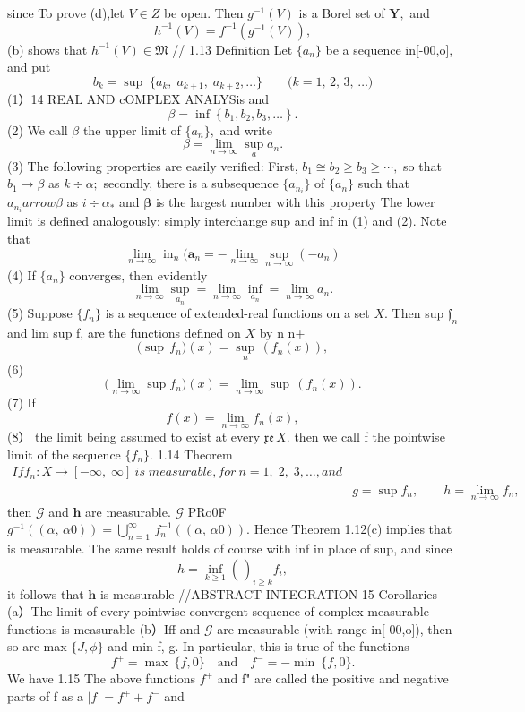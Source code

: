 since To prove (d),let $\scriptstyle V\in Z$ be open. Then $g^{-1}(V)$ is a Borel set of ${\boldsymbol{Y}},$ and $$ h^{-1}(V)=f^{-1}(g^{-1}(V)), $$ (b) shows that $h^{-1}(V)\in{\mathfrak{M}}$ // 1.13 Definition Let $\{a_{n}\}$ be a sequence in[-00,o], and put $$ b_{k}=\operatorname*{sup}\;\{a_{k},\;a_{k+1},\;a_{k+2},\ldots\}\qquad\bigl(k=1,\,2,\,3,\,\ldots\bigr) $$ (1）14 REAL AND cOMPLEX ANALYSis and $$ \beta=\operatorname*{inf}\left\{b_{1},b_{2},b_{3},\ldots\right\}. $$ (2) We call $\beta$ the upper limit of $\{a_{n}\},$ and write $$ \beta=\operatorname*{lim}_{n\to\infty}\operatorname*{sup}_{a}a_{n}. $$ (3) The following properties are easily verified: First, $b_{1}\cong b_{2}\geq b_{3}\geq\cdots,$ so that $b_{1}\to\beta$ as $k\div\alpha;$ secondly, there is a subsequence $\{a_{n_{i}}\}$ of $\{a_{n}\}$ such that $a_{n_{i}} arrow\beta$ as $i\div\alpha_{*}$ and $\boldsymbol{\beta}$ is the largest number with this property The lower limit is defined analogously: simply interchange sup and inf in (1) and (2). Note that $$ \operatorname*{lim}_{n\to\infty}\operatorname{in}_{n}(\mathbf{a}_{n}=\mathbf{-}\operatorname*{lim}_{n\to\infty}\operatorname{sup}_{n\to\infty}\left(-a_{n}\right) $$ (4) If $\{a_{n}\}$ converges, then evidently $$ \operatorname*{lim}_{n\to\infty}\operatorname*{sup}_{a_{n}}=\operatorname*{lim}_{n\to\infty}\operatorname*{inf}_{a_{n}}=\operatorname*{lim}_{n\to\infty}a_{n}. $$ (5) Suppose $\{f_{n}\}$ is a sequence of extended-real functions on a set $X.$ Then sup ${\mathfrak{f}}_{n}$ and lim sup f, are the functions defined on $X$ by n n+ $$ {\biggl(}{\operatorname*{sup}}\,f_{n}{\biggr)}(x)=\operatorname*{sup}_{n}\,(f_{n}(x)), $$ (6) $$ {\biggl(}\operatorname*{lim}_{n\to\infty}\operatorname{sup}f_{n}{\biggr)}(x)=\operatorname*{lim}_{n\to\infty}\operatorname{sup}\,(f_{n}(x)). $$ (7) If $$ f(x)=\operatorname*{lim}_{n\to\infty}f_{n}(x), $$ (8） the limit being assumed to exist at every ${\mathfrak{x e}}\,X.$ then we call f the pointwise limit of the sequence $\{f_{n}\}.$ 1.14 Theorem $$ \begin{array}{c}{{I f f_{n}\colon X\to[-\infty,\;\infty]\ i s\;m e a s u r a b l e,f o r\ n=1,\;2,\;3,\ldots,a n d}}\\ {{}}&{{g=\operatorname*{sup}f_{n},\qquad h=\operatorname*{lim}_{n\to\infty}f_{n},}}\end{array} $$ then $\scriptstyle{\mathcal{G}}$ and $\boldsymbol{h}$ are measurable. $\scriptstyle{\mathcal{G}}$ PRo0F $g^{-1}((\alpha,\,\alpha0))=\bigcup_{n=1}^{\infty}\,f_{n}^{-1}((\alpha,\,\alpha0)).$ Hence Theorem 1.12(c) implies that is measurable. The same result holds of course with inf in place of sup, and since $$ h=\operatorname*{inf}_{k\geq1}{\binom{}{}}_{i\geq k}f_{i}^{}, $$ it follows that $\boldsymbol{h}$ is measurable //ABSTRACT INTEGRATION 15 Corollaries (a）The limit of every pointwise convergent sequence of complex measurable functions is measurable (b）Iff and $\scriptstyle{\mathcal{G}}$ are measurable (with range in[-00,o]), then so are max $\{J,\phi\}$ and min {f, g}. In particular, this is true of the functions $$ f^{+}=\operatorname*{max}\:\{f,0\}\quad\mathrm{and}\quad f^{-}=-\operatorname*{min}\:\{f,0\}. $$ We have 1.15 The above functions $f^{+}$ and f" are called the positive and negative parts of f as a $|f|=f^{+}+f^{-}$ and 